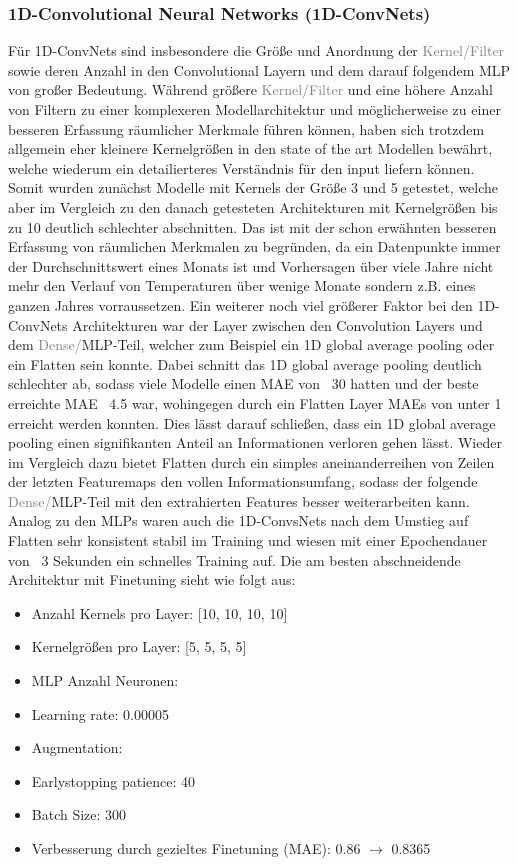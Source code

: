 \documentclass[manuscript,screen,review]{acmart}
\begin{document}
\subsubsection*{1D-Convolutional Neural Networks (1D-ConvNets)}
Für 1D-ConvNets sind insbesondere die Größe und Anordnung der \textcolor{gray}{Kernel/Filter} sowie deren Anzahl in den Convolutional Layern und dem darauf folgendem MLP von großer Bedeutung. 
Während größere \textcolor{gray}{Kernel/Filter} und eine höhere Anzahl von Filtern zu einer komplexeren Modellarchitektur und möglicherweise zu einer besseren Erfassung räumlicher Merkmale führen können, haben sich trotzdem allgemein eher kleinere Kernelgrößen in den state of the art Modellen bewährt, welche wiederum ein detailierteres Verständnis für den input liefern können.
Somit wurden zunächst Modelle mit Kernels der Größe 3 und 5 getestet, welche aber im Vergleich zu den danach getesteten Architekturen mit Kernelgrößen bis zu 10 deutlich schlechter abschnitten. Das ist mit der schon erwähnten besseren Erfassung von räumlichen Merkmalen zu begründen, da ein Datenpunkte immer der Durchschnittswert eines Monats ist und Vorhersagen über viele Jahre nicht mehr den Verlauf von Temperaturen über wenige Monate sondern z.B. eines ganzen Jahres vorraussetzen.
Ein weiterer noch viel größerer Faktor bei den 1D-ConvNets Architekturen war der Layer zwischen den Convolution Layers und dem \textcolor{gray}{Dense/}MLP-Teil, welcher zum Beispiel ein 1D global average pooling oder ein Flatten sein konnte. Dabei schnitt das 1D global average pooling deutlich schlechter ab, sodass viele Modelle einen MAE von ~30 hatten und der beste erreichte MAE ~4.5 war, wohingegen durch ein Flatten Layer MAEs von unter 1 erreicht werden konnten. Dies lässt darauf schließen, dass ein 1D global average pooling einen signifikanten Anteil an Informationen verloren gehen lässt. Wieder im Vergleich dazu bietet Flatten durch ein simples aneinanderreihen von Zeilen der letzten Featuremaps den vollen Informationsumfang, sodass der folgende \textcolor{gray}{Dense/}MLP-Teil mit den extrahierten Features besser weiterarbeiten kann.
 Analog zu den MLPs waren auch die 1D-ConvsNets nach dem Umstieg auf Flatten sehr konsistent stabil im Training und wiesen mit einer Epochendauer von ~3 Sekunden ein schnelles Training auf. 
Die am besten abschneidende Architektur mit Finetuning sieht wie folgt aus:
\begin{itemize}
    \item Anzahl Kernels pro Layer: [10, 10, 10, 10]
    \item Kernelgrößen pro Layer: [5, 5, 5, 5]
    \item MLP Anzahl Neuronen: 
    \item Learning rate: 0.00005
    \item Augmentation: 
    \item Earlystopping patience: 40
    \item Batch Size: 300
    \item Verbesserung durch gezieltes Finetuning (MAE): 0.86 $\rightarrow$ 0.8365
\end{itemize}
\end{document}
